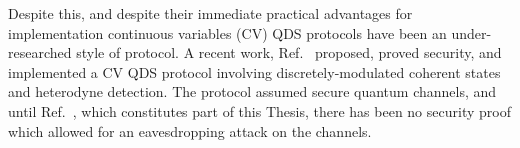 Despite this, and despite their immediate practical advantages for implementation continuous variables (CV) QDS protocols have been an under-researched style of protocol.  A recent work, Ref.~\cite{Croal2016} proposed, proved security, and implemented a CV QDS protocol involving discretely-modulated coherent states and heterodyne detection. The protocol assumed secure quantum channels, and until Ref.~\cite{Thornton2019}, which constitutes part of this Thesis, there has been no security proof which allowed for an eavesdropping attack on the channels.

